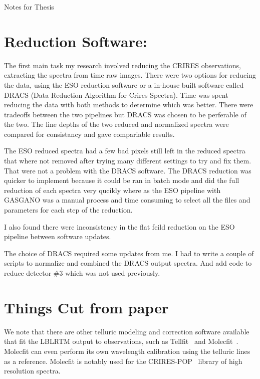 Notes for Thesis

\section{Reduction Software:}

The first main task my research involved reducing the CRIRES observations, extracting the spectra from time raw images. There were two options for reducing the data, using the ESO reduction software or a in-house built software called {DRACS} (Data Reduction Algorithm for Crires Spectra). Time was spent reducing the data with both methods to determine which was better.
There were tradeoffs between the two pipelines but {DRACS} was chosen to be perferable of the two. The line depths of the two reduced and normalized spectra were compared for consistancy and gave compariable results.

The ESO reduced spectra had a few bad pixels still left in the reduced spectra that where not removed after trying many different settings to try and fix them.
That were not a problem with the {DRACS} software.
The {DRACS} reduction was quicker to implement because it could be ran in batch mode and did the full reduction of each spectra very qucikly where as the ESO pipeline with GASGANO was a manual process and time consuming to select all the files and parameters for each step of the reduction.

I also found there were inconsistency in the flat feild reduction on the ESO pipeline between software updates.

The choice of {DRACS} required some updates from me. I had to write a couple of scripts to normalize and combined the {DRACS} output spectra. And add code to reduce detector $\#3$ which was not used previously.




\section{Things Cut from paper}

We note that there are other telluric modeling and correction software available that fit the LBLRTM output to observations, such as Tellfit~\citep{gullikson_correcting_2014} and Molecfit~\citep{smette_molecfit:_2015}. Molecfit can even perform its own wavelength calibration using the telluric lines as a reference. Molecfit is notably used for the CRIRES-POP~\citep{nicholls_crires-pop:_2017} library of high resolution spectra.



